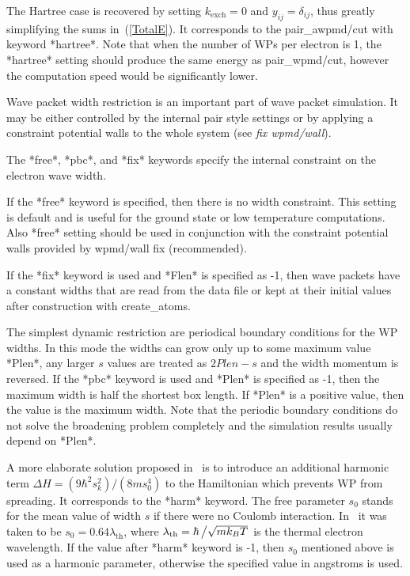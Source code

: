 \documentclass[a4paper,12pt]{article}
\begin{document}
The Hartree case is recovered by setting
$k_\mathrm{exch}=0$ and $y_{ij}=\delta_{ij}$, thus greatly simplifying the sums
in~(\ref{TotalE}). It corresponds to the pair\_awpmd/cut with keyword *hartree*. Note that when the number of WPs per electron is 1, the *hartree* setting should produce the same energy as pair\_wpmd/cut, however the computation speed would be significantly lower.  

Wave packet width restriction is an important part of wave packet simulation. It may be either controlled by the internal pair style settings or by applying a constraint potential walls to the whole system (see \textsl{fix wpmd/wall}).

The *free*, *pbc*, and *fix* keywords specify the internal constraint on
the electron wave width.  

If the *free* keyword is specified, then there is no width
constraint. This setting is default and is useful for the ground state or low temperature computations. Also *free* setting should be used in conjunction with the constraint potential walls provided by wpmd/wall fix (recommended).  

If the *fix* keyword is used and *Flen* is specified as -1, then wave packets
have a constant widths that are read from the data file or kept at their initial values after construction with create\_atoms.

The simplest dynamic restriction are periodical boundary conditions for the WP widths.
In this mode the widths can grow only up to some maximum value *Plen*, any larger $s$ values are treated as $2Plen -s$ and the width momentum is reversed.
If the *pbc* keyword is used and *Plen* is specified as
-1, then the maximum width is half the shortest box length.  If *Plen*
is a positive value, then the value is the maximum width. Note that the periodic boundary conditions do not solve the broadening problem completely and the simulation results usually depend on *Plen*. 

A more elaborate solution proposed in~\cite{Zwicknagel:JPA06} is to introduce an
additional harmonic term $\Delta H = (9\hbar^2s_k^2)/(8ms_0^4)$
to the Hamiltonian which prevents WP from spreading. It corresponds to the *harm* keyword.
The free parameter $s_0$ stands
for the mean value of width $s$ if there were no Coulomb interaction.
In~\cite{Zwicknagel:JPA06} it was taken to be $s_0 = 0.64\lambda_\mathrm{th}$,
where $\lambda_\mathrm{th} = \hbar \left/ \sqrt{m k_B T} \right.$ is the
thermal electron wavelength. If the value after *harm* keyword is -1, then $s_0$ mentioned above is used as a harmonic parameter, otherwise the specified value in angstroms is used.
\end{document}
